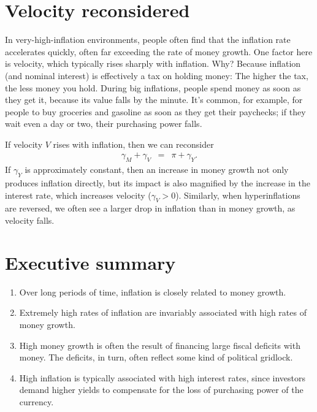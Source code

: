 \section{Velocity reconsidered}

In very-high-inflation environments,
people often find that the inflation rate accelerates
quickly, often far exceeding the rate of money growth.
One factor here is velocity, which typically
rises sharply with inflation.
Why?
Because inflation (and nominal interest) is effectively a tax on holding money:
The higher the tax, the less money you hold.
During big inflations,
people spend money as soon as they get it, because its
value falls by the minute.
It's common, for example, for people to buy groceries
and gasoline as soon as they get their paychecks;
if they wait even a day or two, their purchasing power falls.

If velocity $V$ rises with inflation, then we can reconsider
\begin{eqnarray}
    \gamma_M + \gamma_V  &=&  \pi + \gamma_Y .
\end{eqnarray}
If $\gamma_Y$ is approximately constant,
then an increase in money growth not only
produces inflation directly, but
its impact is also magnified by the increase in the
interest rate, which increases velocity ($\gamma_V > 0$).
Similarly, when hyperinflations are reversed,
we often see a larger drop in inflation
than in money growth, as velocity falls.


\section*{Executive summary}

\setlength{\leftmargini}{.5\oldleftmargini}
\begin{enumerate}
\item Over long periods of time, inflation is closely related to money growth.


\item Extremely high rates of inflation are invariably associated with high rates of money growth.

\item High money growth is often the result of financing large fiscal deficits with money.
    The deficits, in turn, often reflect some kind of political gridlock.

\item High inflation is typically associated with high interest rates,
since investors demand higher yields 
 to compensate for the loss of purchasing
power of the currency.
\end{enumerate}
\setlength{\leftmargini}{\oldleftmargini}

